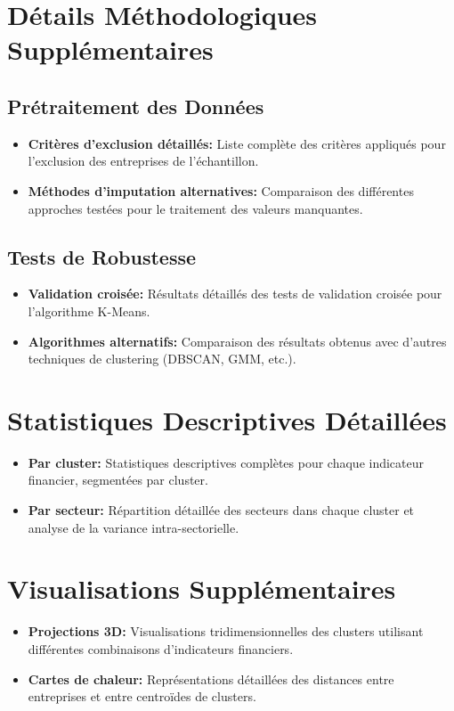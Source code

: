 \begin{appendices}
\section{Détails Méthodologiques Supplémentaires}
\subsection{Prétraitement des Données}
\begin{itemize}
    \item \textbf{Critères d'exclusion détaillés:} Liste complète des critères appliqués pour l'exclusion des entreprises de l'échantillon.
    \item \textbf{Méthodes d'imputation alternatives:} Comparaison des différentes approches testées pour le traitement des valeurs manquantes.
\end{itemize}

\subsection{Tests de Robustesse}
\begin{itemize}
    \item \textbf{Validation croisée:} Résultats détaillés des tests de validation croisée pour l'algorithme K-Means.
    \item \textbf{Algorithmes alternatifs:} Comparaison des résultats obtenus avec d'autres techniques de clustering (DBSCAN, GMM, etc.).
\end{itemize}

\section{Statistiques Descriptives Détaillées}
\begin{itemize}
    \item \textbf{Par cluster:} Statistiques descriptives complètes pour chaque indicateur financier, segmentées par cluster.
    \item \textbf{Par secteur:} Répartition détaillée des secteurs dans chaque cluster et analyse de la variance intra-sectorielle.
\end{itemize}

\section{Visualisations Supplémentaires}
\begin{itemize}
    \item \textbf{Projections 3D:} Visualisations tridimensionnelles des clusters utilisant différentes combinaisons d'indicateurs financiers.
    \item \textbf{Cartes de chaleur:} Représentations détaillées des distances entre entreprises et entre centroïdes de clusters.
\end{itemize}
\end{appendices}

